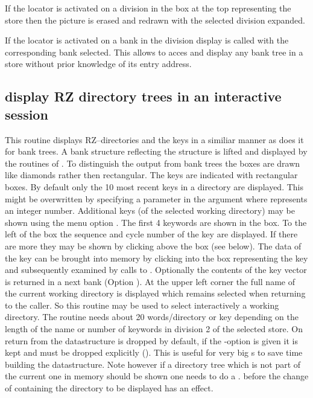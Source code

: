 If the locator is activated on a division in the box at the top
representing the store then  the picture is erased and redrawn
with the selected division expanded.
 
If the locator is activated on a bank in the division display
 is called with the corresponding bank selected.
This allows to acces and display any bank tree in a store
without prior knowledge of its entry address.
 
\newpage
 
\subsection[{\tt DZDIRZ} display RZ directory trees in an interactive session]%
           { display RZ directory trees in an interactive session}
 
This routine displays RZ--directories and the keys in a similiar manner as
 does it for bank trees. 
A bank structure reflecting the \RZfile{}
structure is lifted and displayed by  the routines of .
To distinguish the output from bank trees the boxes are
drawn like diamonds rather then rectangular. 
The keys are indicated with rectangular boxes. 
By default only the 10 most recent keys in a directory are displayed. 
This might be overwritten by specifying a parameter 
in the  argument where  represents an integer number.
Additional keys (of the selected working directory) 
may be shown using the menu option .
The first 4 keywords are shown in the box. 
To the left of the box the sequence
and cycle number of the key are displayed.
If there are more they may be shown by clicking above the box (see below).
The data of the key can be brought into memory by clicking into the
box representing the key and subsequently examined by calls to .
Optionally the contents of the key vector is returned in a next bank (Option ).
At the upper left corner the full name of the current working directory
is displayed which remains selected when returning to the caller.
So this routine may be used to select interactively a working directory.
The routine needs about 20 words/directory or key depending on
the length of the name or number of keywords in division 2 of the
selected store. 
On return from  the datastructure is dropped
by default, if the -option is given it is kept and must be dropped
explicitly (). 
This is useful for very big \RZfile s to save time building the datastructure. 
Note however if a directory tree which is
not part of the current one in memory should be shown
one needs to do a .
before the change of  containing the directory
to be displayed has an effect.
 
